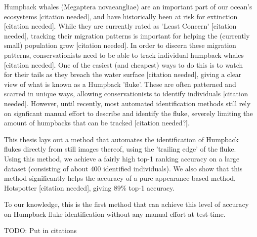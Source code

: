  

Humpback whales (Megaptera novaeangliae) are an important part of our ocean's ecosystems [citation needed], and have historically been at risk for extinction [citation needed]. 
While they are currently rated as 'Least Concern' [citation needed], tracking their migration patterns is important for helping the (currently small) population grow [citation needed]. 
In order to discern these migration patterns, conservationists need to be able to track individual humpback whales [citation needed].
One of the easiest (and cheapest) ways to do this is to watch for their tails as they breach the water surface [citation needed], giving a clear view of what is known as a Humpback 'fluke'.
These are often patterned and scarred in unique ways, allowing conservationists to identify individuals [citation needed].
However, until recently, most automated identification methods still rely on signficant manual effort to describe and identify the fluke, severely limiting the amount of humpbacks that can be tracked [citation needed?].

This thesis lays out a method that automates the identification of Humpback flukes directly from still images thereof, using the 'trailing edge' of the fluke.
Using this method, we achieve a fairly high top-1 ranking accuracy on a large dataset (consisting of about 400 identified individuals).
We also show that this method significantly helps the accuracy of a pure appearance based method, Hotspotter [citation needed], giving 89\% top-1 accuracy.

To our knowledge, this is the first method that can achieve this level of accuracy on Humpback fluke identification without any manual effort at test-time.

TODO: Put in citations


